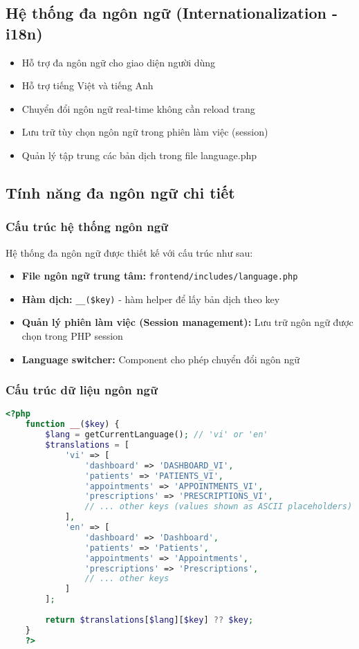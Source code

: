 \documentclass[12pt,a4paper]{report}
\begin{document}
    \subsection{Hệ thống đa ngôn ngữ (Internationalization - i18n)}
    \begin{itemize}
        \item Hỗ trợ đa ngôn ngữ cho giao diện người dùng
        \item Hỗ trợ tiếng Việt và tiếng Anh
        \item Chuyển đổi ngôn ngữ real-time không cần reload trang
        \item Lưu trữ tùy chọn ngôn ngữ trong phiên làm việc (session)
        \item Quản lý tập trung các bản dịch trong file language.php
    \end{itemize}

    \subsection{Tính năng đa ngôn ngữ chi tiết}
    \subsubsection{Cấu trúc hệ thống ngôn ngữ}
    Hệ thống đa ngôn ngữ được thiết kế với cấu trúc như sau:
    \begin{itemize}
        \item \textbf{File ngôn ngữ trung tâm:} \texttt{frontend/includes/language.php}
        \item \textbf{Hàm dịch:} \texttt{\_\_(\$key)} - hàm helper để lấy bản dịch theo key
        \item \textbf{Quản lý phiên làm việc (Session management):} Lưu trữ ngôn ngữ được chọn trong PHP session
        \item \textbf{Language switcher:} Component cho phép chuyển đổi ngôn ngữ
    \end{itemize}

    \subsubsection{Cấu trúc dữ liệu ngôn ngữ}
    \begin{lstlisting}[language=PHP, caption=language.php structure]
    <?php
    function __($key) {
        $lang = getCurrentLanguage(); // 'vi' or 'en'
        $translations = [
            'vi' => [
                'dashboard' => 'DASHBOARD_VI',
                'patients' => 'PATIENTS_VI',
                'appointments' => 'APPOINTMENTS_VI',
                'prescriptions' => 'PRESCRIPTIONS_VI',
                // ... other keys (values shown as ASCII placeholders)
            ],
            'en' => [
                'dashboard' => 'Dashboard',
                'patients' => 'Patients',
                'appointments' => 'Appointments',
                'prescriptions' => 'Prescriptions',
                // ... other keys
            ]
        ];
        
        return $translations[$lang][$key] ?? $key;
    }
    ?>
    \end{lstlisting}
\end{document}
